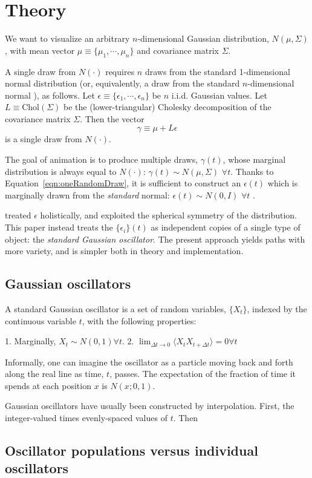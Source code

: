 \section{Theory}
\label{sec:theory}

We want to visualize an arbitrary $n$-dimensional Gaussian distribution,
  $N(\mu, \Sigma)$,
with mean vector
  $\mu \equiv \{\mu_1, \cdots, \mu_n\}$
and covariance matrix $\Sigma$.

A single draw from $N(\cdot)$ requires $n$ draws from the standard
1-dimensional normal distribution \cite{3569}
(or, equivalently, a draw from the standard $n$-dimensional normal
\cite{hennig-tr-is-8}), as follows.
Let
  $\epsilon \equiv \{\epsilon_1, \cdots, \epsilon_n\}$
be $n$ i.i.d. Gaussian values.
Let
  $L \equiv \text{Chol}(\Sigma)$
be the (lower-triangular) Cholesky decomposition of the covariance matrix
$\Sigma$.
Then the vector
  \begin{equation}
    \gamma \equiv \mu + L \epsilon
    \label{eqn:oneRandomDraw}
  \end{equation}
is a single draw from $N(\cdot)$.

The goal of animation is to produce multiple draws, $\gamma(t)$, whose
marginal distribution is always equal to $N(\cdot)$:
  $\gamma(t) \sim N(\mu, \Sigma) \,\, \forall t$.
Thanks to Equation~\ref{eqn:oneRandomDraw}, it is sufficient to construct an
$\epsilon(t)$ which is marginally drawn from the \textit{standard} normal:
  $\epsilon(t) \sim N(0, I) \,\, \forall t$
\cite{hennig-tr-is-8}.

\cite{hennig-tr-is-8} treated $\epsilon$ holistically, and exploited the
spherical symmetry of the distribution.
This paper instead treats the $\{\epsilon_i\}(t)$ as independent copies of
a single type of object: the \textit{standard Gaussian oscillator}.
The present approach yields paths with more variety, and is simpler both in
theory and implementation.

\subsection{Gaussian oscillators}
\label{sub:gaussian_oscillators}

A standard Gaussian oscillator is a set of random variables, $\{X_t\}$,
indexed by the continuous variable $t$, with the following properties:

1. Marginally, $X_t \sim N(0, 1) \forall t$.
2. $\lim_{\Delta t \rightarrow 0} \langle X_t X_{t + \Delta t} \rangle = 0
   \forall t$

Informally, one can imagine the oscillator as a particle moving back and forth
along the real line as time, $t$, passes.  The expectation of the fraction of
time it spends at each position $x$ is $N(x; 0, 1)$.

Gaussian oscillators have usually been constructed by interpolation.
First, the integer-valued times
evenly-spaced values of $t$.  Then

\subsection{Oscillator populations versus individual oscillators}
\label{sub:oscillator_populations_versus_individual_oscillators}
